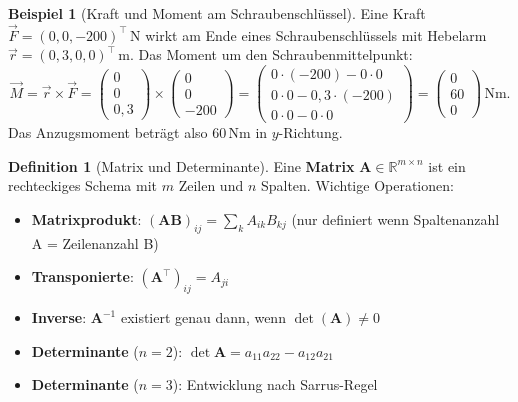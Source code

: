 ﻿\documentclass[a4paper,12pt]{report}
\theoremstyle{definition}
\newtheorem{definition}{Definition}
\newtheorem{beispiel}{Beispiel}
\begin{document}
\begin{beispiel}[Kraft und Moment am Schraubenschl\"ussel]
Eine Kraft $\vec{F} = (0, 0, -200)^\top\,\mathrm{N}$ wirkt am Ende eines
Schraubenschl\"ussels mit Hebelarm $\vec{r} = (0{,}3, 0, 0)^\top\,\mathrm{m}$.
Das Moment um den Schraubenmittelpunkt:
\[
  \vec{M} = \vec{r} \times \vec{F}
  = \begin{pmatrix}0\\0\\0{,}3\end{pmatrix}
    \times
    \begin{pmatrix}0\\0\\-200\end{pmatrix}
  = \begin{pmatrix}0\cdot(-200)-0\cdot0 \\ 0\cdot0-0{,}3\cdot(-200) \\ 0\cdot0-0\cdot0\end{pmatrix}
  = \begin{pmatrix}0\\60\\0\end{pmatrix}\,\mathrm{Nm}.
\]
Das Anzugsmoment betr\"agt also $60\,\mathrm{Nm}$ in $y$-Richtung.
\end{beispiel}

\begin{definition}[Matrix und Determinante]
Eine \textbf{Matrix} $\mathbf{A} \in \mathbb{R}^{m\times n}$ ist ein
rechteckiges Schema mit $m$ Zeilen und $n$ Spalten. Wichtige Operationen:
\begin{itemize}
    \item[-] \textbf{Matrixprodukt}: $(\mathbf{AB})_{ij} = \sum_k A_{ik} B_{kj}$ (nur definiert wenn Spaltenanzahl A = Zeilenanzahl B)
    \item[-] \textbf{Transponierte}: $(\mathbf{A}^\top)_{ij} = A_{ji}$
    \item[-] \textbf{Inverse}: $\mathbf{A}^{-1}$ existiert genau dann, wenn $\det(\mathbf{A}) \neq 0$
    \item[-] \textbf{Determinante} ($n=2$): $\det\mathbf{A} = a_{11}a_{22} - a_{12}a_{21}$
    \item[-] \textbf{Determinante} ($n=3$): Entwicklung nach Sarrus-Regel
\end{itemize}
\end{definition}
\end{document}
